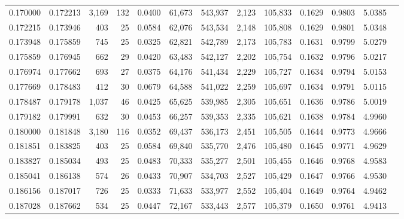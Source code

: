 \begin{tabular}{rrrrrrrrrrrrr}
0.170000 & 0.172213 & 3,169 & 132 &                                     0.0400 &  61,673 & 543,937 &   2,123 & 105,833 & 0.1629 & 0.9803 & 5.0385 \\
0.172215 & 0.173946 &   403 &  25 &                                     0.0584 &  62,076 & 543,534 &   2,148 & 105,808 & 0.1629 & 0.9801 & 5.0348 \\
0.173948 & 0.175859 &   745 &  25 &                                     0.0325 &  62,821 & 542,789 &   2,173 & 105,783 & 0.1631 & 0.9799 & 5.0279 \\
0.175859 & 0.176945 &   662 &  29 &                                     0.0420 &  63,483 & 542,127 &   2,202 & 105,754 & 0.1632 & 0.9796 & 5.0217 \\
0.176974 & 0.177662 &   693 &  27 &                                     0.0375 &  64,176 & 541,434 &   2,229 & 105,727 & 0.1634 & 0.9794 & 5.0153 \\
0.177669 & 0.178483 &   412 &  30 &                                     0.0679 &  64,588 & 541,022 &   2,259 & 105,697 & 0.1634 & 0.9791 & 5.0115 \\
0.178487 & 0.179178 & 1,037 &  46 &                                     0.0425 &  65,625 & 539,985 &   2,305 & 105,651 & 0.1636 & 0.9786 & 5.0019 \\
0.179182 & 0.179991 &   632 &  30 &                                     0.0453 &  66,257 & 539,353 &   2,335 & 105,621 & 0.1638 & 0.9784 & 4.9960 \\
0.180000 & 0.181848 & 3,180 & 116 &                                     0.0352 &  69,437 & 536,173 &   2,451 & 105,505 & 0.1644 & 0.9773 & 4.9666 \\
0.181851 & 0.183825 &   403 &  25 &                                     0.0584 &  69,840 & 535,770 &   2,476 & 105,480 & 0.1645 & 0.9771 & 4.9629 \\
0.183827 & 0.185034 &   493 &  25 &                                     0.0483 &  70,333 & 535,277 &   2,501 & 105,455 & 0.1646 & 0.9768 & 4.9583 \\
0.185041 & 0.186138 &   574 &  26 &                                     0.0433 &  70,907 & 534,703 &   2,527 & 105,429 & 0.1647 & 0.9766 & 4.9530 \\
0.186156 & 0.187017 &   726 &  25 &                                     0.0333 &  71,633 & 533,977 &   2,552 & 105,404 & 0.1649 & 0.9764 & 4.9462 \\
0.187028 & 0.187662 &   534 &  25 &                                     0.0447 &  72,167 & 533,443 &   2,577 & 105,379 & 0.1650 & 0.9761 & 4.9413 \\

\end{tabular}
